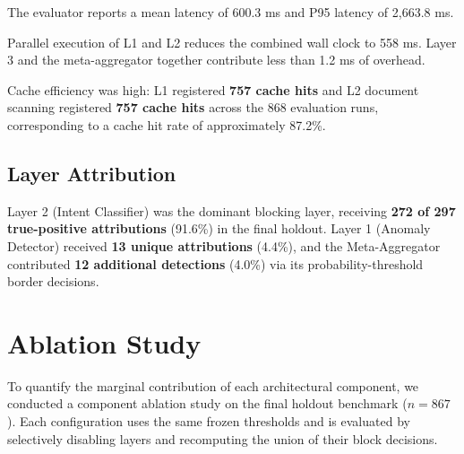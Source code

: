 \documentclass[conference]{IEEEtran}
\begin{document}
The evaluator reports a mean latency of 600.3 ms and P95 latency of 2,663.8 ms.


Parallel execution of L1 and L2 reduces the combined wall clock to 558 ms. Layer 3 and the meta-aggregator together contribute less than 1.2 ms of overhead.


Cache efficiency was high: L1 registered \textbf{757 cache hits} and L2 document scanning registered \textbf{757 cache hits} across the 868 evaluation runs, corresponding to a cache hit rate of approximately 87.2\%.


\subsection{Layer Attribution}

Layer 2 (Intent Classifier) was the dominant blocking layer, receiving \textbf{272 of 297 true-positive attributions} (91.6\%) in the final holdout. Layer 1 (Anomaly Detector) received \textbf{13 unique attributions} (4.4\%), and the Meta-Aggregator contributed \textbf{12 additional detections} (4.0\%) via its probability-threshold border decisions.



\section{Ablation Study}

To quantify the marginal contribution of each architectural component, we conducted a component ablation study on the final holdout benchmark ($n = 867$). Each configuration uses the same frozen thresholds and is evaluated by selectively disabling layers and recomputing the union of their block decisions.
\end{document}
